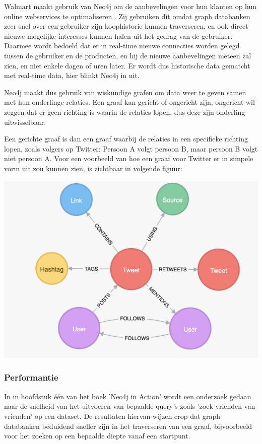 Walmart maakt gebruik van Neo4j om de aanbevelingen voor hun klanten op hun online webservices te optimaliseren \autocite{neo4jWalmart2014}. Zij gebruiken dit omdat graph databanken zeer snel over een gebruiker zijn koophistorie kunnen traverseren, en ook direct nieuwe mogelijke interesses kunnen halen uit het gedrag van de gebruiker. Daarmee wordt bedoeld dat er in real-time nieuwe connecties worden gelegd tussen de gebruiker en de producten, en hij de nieuwe aanbevelingen meteen zal zien, en niet enkele dagen of uren later. Er wordt dus historische data gematcht met real-time data, hier blinkt Neo4j in uit. 

Neo4j maakt dus gebruik van wiskundige grafen om data weer te geven samen met hun onderlinge relaties. Een graaf kan gericht of ongericht zijn, ongericht wil zeggen dat er geen richting is waarin de relaties lopen, dus deze zijn onderling uitwisselbaar. 

Een gerichte graaf is dan een graaf waarbij de relaties in een specifieke richting lopen, zoals volgers op Twitter: Persoon A volgt persoon B, maar persoon B volgt niet persoon A. Voor een voorbeeld van hoe een graaf voor Twitter er in simpele vorm uit zou kunnen zien, is zichtbaar in volgende figuur:

\includegraphics[width=\linewidth]{img/twitter_graph}

\subsubsection{Performantie}
\label{subsubsec:Performantie}

In in hoofdstuk één van het boek 'Neo4j in Action' \autocite{Vukotic2014} wordt een onderzoek gedaan naar de snelheid van het uitvoeren van bepaalde query's zoals 'zoek vrienden van vrienden' op een dataset. De resultaten hiervan wijzen erop dat graph databanken beduidend sneller zijn in het traverseren van een graaf, bijvoorbeeld voor het zoeken op een bepaalde diepte vanaf een startpunt.

